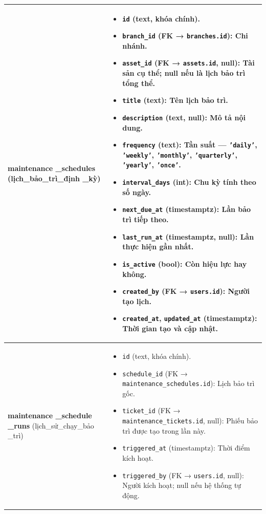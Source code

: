 \begin{longtable}{|>{\centering\arraybackslash}m{4.5cm}|>{\raggedright\arraybackslash}m{11.5cm}|}
\textbf{maintenance \_schedules} \newline (lịch\_bảo\_trì\_định \_kỳ) &
\begin{itemize}
    \item \texttt{id} (text, khóa chính).
    \item \texttt{branch\_id} (FK → \texttt{branches.id}): Chi nhánh.
    \item \texttt{asset\_id} (FK → \texttt{assets.id}, null): Tài sản cụ thể; null nếu là lịch bảo trì tổng thể.
    \item \texttt{title} (text): Tên lịch bảo trì.
    \item \texttt{description} (text, null): Mô tả nội dung.
    \item \texttt{frequency} (text): Tần suất — \texttt{'daily'}, \texttt{'weekly'}, \texttt{'monthly'}, \texttt{'quarterly'}, \texttt{'yearly'}, \texttt{'once'}.
    \item \texttt{interval\_days} (int): Chu kỳ tính theo số ngày.
    \item \texttt{next\_due\_at} (timestamptz): Lần bảo trì tiếp theo.
    \item \texttt{last\_run\_at} (timestamptz, null): Lần thực hiện gần nhất.
    \item \texttt{is\_active} (bool): Còn hiệu lực hay không.
    \item \texttt{created\_by} (FK → \texttt{users.id}): Người tạo lịch.
    \item \texttt{created\_at}, \texttt{updated\_at} (timestamptz): Thời gian tạo và cập nhật.
\end{itemize} \\ \hline

\textbf{maintenance \_schedule \_runs} \newline (lịch\_sử\_chạy\_bảo \_trì) &
\begin{itemize}
    \item \texttt{id} (text, khóa chính).
    \item \texttt{schedule\_id} (FK → \texttt{maintenance\_schedules.id}): Lịch bảo trì gốc.
    \item \texttt{ticket\_id} (FK → \texttt{maintenance\_tickets.id}, null): Phiếu bảo trì được tạo trong lần này.
    \item \texttt{triggered\_at} (timestamptz): Thời điểm kích hoạt.
    \item \texttt{triggered\_by} (FK → \texttt{users.id}, null): Người kích hoạt; null nếu hệ thống tự động.
\end{itemize} \\ \hline


\end{longtable}

